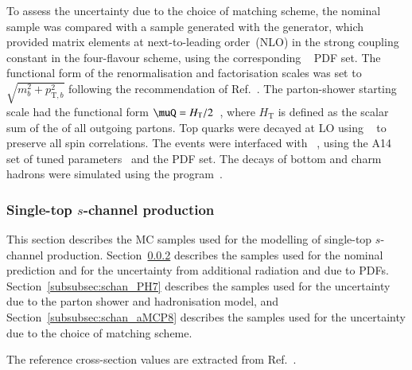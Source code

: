 To assess the uncertainty due to the choice of matching scheme, the nominal sample was compared with a sample generated
with the \MGNLO[2.6.2] generator, which provided matrix elements at next-to-leading order~(NLO) in the strong coupling constant \alphas
in the four-flavour scheme, using the corresponding \NNPDF[3.0nlo]~\cite{Ball:2014uwa} PDF set.
The functional form of the renormalisation and factorisation scales was set to $\sqrt{m_b^2 + p_{\text{T},b}^2}$
following the recommendation of Ref.~\cite{Frederix:2012dh}.
The parton-shower starting scale had the functional form $\muQ = H_\text{T}/2$~\cite{ATL-PHYS-PUB-2017-007}, 
where $H_\text{T}$ is defined as the scalar sum of the \pT of all outgoing partons.
Top quarks were decayed at LO using \MADSPIN~\cite{Frixione:2007zp,Artoisenet:2012st} to preserve all spin correlations.
The events were interfaced with \PYTHIA[8.230]~\cite{Sjostrand:2014zea}, using the A14 set of tuned parameters~\cite{ATL-PHYS-PUB-2014-021} 
and the \NNPDF[2.3lo] PDF set.
The decays of bottom and charm hadrons were simulated using the \EVTGEN[1.6.0] program~\cite{Lange:2001uf}.



\subsubsection{Single-top \texorpdfstring{$s$}{s}-channel production}
\label{subsec:schan}

This section describes the MC samples used for the modelling of single-top $s$-channel production.
Section~\ref{subsubsec:schan_PP8} describes the \POWPY[8] samples used for the nominal prediction
and for the uncertainty from additional radiation and due to PDFs.
Section~\ref{subsubsec:schan_PH7} describes the \POWHER[7] samples used for the uncertainty due to the parton shower and hadronisation model,
and Section~\ref{subsubsec:schan_aMCP8} describes the \MGNLOPY[8] samples used for the uncertainty due to the choice of matching scheme.

The reference cross-section values are extracted from Ref.~\cite{LHCTopWGsgtopXsec}.

\subsubsection[Powheg+Pythia8]{\POWPY[8]}
\label{subsubsec:schan_PP8}


